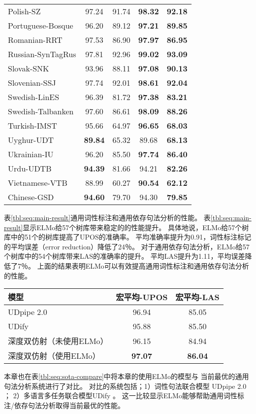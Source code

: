 \begin{longtable}{p{5cm}cccc}
Polish-SZ & 97.24 & 91.74 & \bf 98.32 & \bf 92.18 \\
Portuguese-Bosque & 96.20 & 89.12 & \bf 97.21 & \bf 89.85 \\
Romanian-RRT & 97.53 & 86.90 & \bf 97.97 & \bf 86.95 \\
Russian-SynTagRus & 97.81 & 92.96 & \bf 99.02 & \bf 93.09 \\
Slovak-SNK & 93.96 & 88.11 & \bf 97.08 & \bf 90.13 \\
Slovenian-SSJ & 97.74 & 92.01 & \bf 98.61 & \bf 92.04 \\
Swedish-LinES & 96.39 & 81.72 & \bf 97.38 & \bf 83.21 \\
Swedish-Talbanken & 97.60 & 86.61 & \bf 98.09 & \bf 88.26 \\
Turkish-IMST & 95.66 & 64.97 & \bf 96.65 & \bf 68.03 \\
Uyghur-UDT & \bf 89.84 & 65.32 & 89.68 & \bf 68.13 \\
Ukrainian-IU & 96.20 & 85.50 & \bf 97.74 & \bf 86.40 \\
Urdu-UDTB & \bf 94.39 & 81.66 & 94.21 & \bf 82.26 \\
Vietnamese-VTB & 88.99 & 60.27 & \bf 90.54 & \bf 62.12 \\
Chinese-GSD & \bf 94.60 & 79.70 & 94.30 & \bf 79.85 \\
\end{longtable}\normalsize

表\ref{tbl:seq:main-result}通用词性标注和通用依存句法分析的性能。
表\ref{tbl:seq:main-result}显示ELMo给57个树库带来稳定的的性能提升。
具体地说，ELMo给57个树库中的51个的树库提高了UPOS的准确率。
平均准确率提升为0.91，词性标注标记的平均误差（error reduction）降低了24％。
对于通用依存句法分析，ELMo给57个树库中的54个树库带来LAS的准确率的提升。
平均LAS提升为1.11，平均误差降低了7％。
上面的结果表明ELMo可以有效提高通用词性标注和通用依存句法分析的性能。

\begin{table}[t]
	\vspace{0.5em}\centering\wuhao
	\begin{tabular}{lcc}
		\toprule[1.5pt]
		模型 & 宏平均-UPOS & 宏平均-LAS \\
		\midrule[1pt]
		UDpipe 2.0 \cite{K18-2020} & 96.94 & 85.05 \\
		UDify \cite{DBLP:journals/corr/abs-1904-02099} & 95.88 & 85.50 \\
		深度双仿射（未使用ELMo） & 96.15 & 84.94 \\
		深度双仿射（使用ELMo） & \bf 97.07 & \bf 86.04 \\
		\bottomrule[1.5pt]
	\end{tabular}
\end{table}
本章也在表\ref{tbl:seq:sota-compare}中将本章的使用ELMo的模型与
当前最优的通用句法分析系统进行了对比。
对比的系统包括；1）词性句法联合模型 UDpipe 2.0 \cite{K18-2020}；
2）多语言多任务联合模型UDify \cite{DBLP:journals/corr/abs-1904-02099}。
这一比较显示ELMo能够帮助通用词性标注/依存句法分析取得当前最优的性能。

